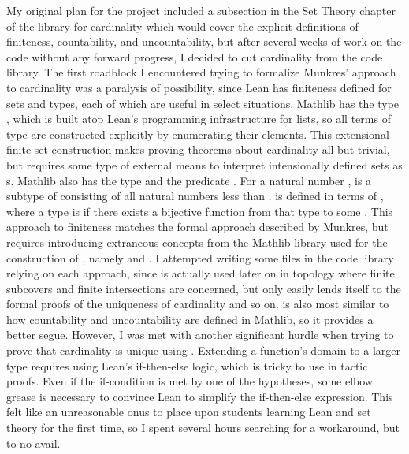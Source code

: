 My original plan for the project
included a subsection in the Set Theory chapter of the library for
cardinality which would cover the explicit definitions of finiteness, 
countability, and uncountability, but after several weeks of work on 
the code without any forward progress, I decided to cut cardinality
from the code library. The first roadblock I encountered trying to
formalize Munkres' approach to cardinality was a paralysis of possibility, 
since Lean has finiteness defined for sets and types, each of which are
useful in select situations. Mathlib has the type , which is 
built atop Lean's programming infrastructure for lists, so all terms 
of type  are constructed explicitly by enumerating their 
elements. This extensional finite set construction makes proving theorems about
cardinality all but trivial, but requires some type of external means
to interpret intensionally defined sets as s. Mathlib also 
has the type  and the 
predicate . For a natural number , 
 is a subtype of  consisting of all natural numbers
less than .  is defined in terms of , where
a type is  if there exists a bijective function from
that type to some . This approach to finiteness matches the formal
approach described by Munkres, but requires introducing extraneous concepts
from the Mathlib library used for the construction of , namely
 and . I attempted writing some files in the code
library relying on each approach, since  is actually used 
later on in topology where finite subcovers and finite intersections are 
concerned, but only  easily lends itself to the formal proofs of
the uniqueness of cardinality and so on.  is also most similar
to how countability and uncountability are defined in Mathlib, so it provides
a better segue. However, I was met with another significant hurdle when trying
to prove that cardinality is unique using . Extending a function's 
domain to a larger type requires using Lean's if-then-else logic, which
is tricky to use in tactic proofs. Even if the if-condition is met by 
one of the hypotheses, some elbow grease is necessary to convince Lean to
simplify the if-then-else expression. This felt like an unreasonable onus 
to place upon students learning Lean and set theory for the first time, so 
I spent several hours searching for a workaround, but to no avail. 

